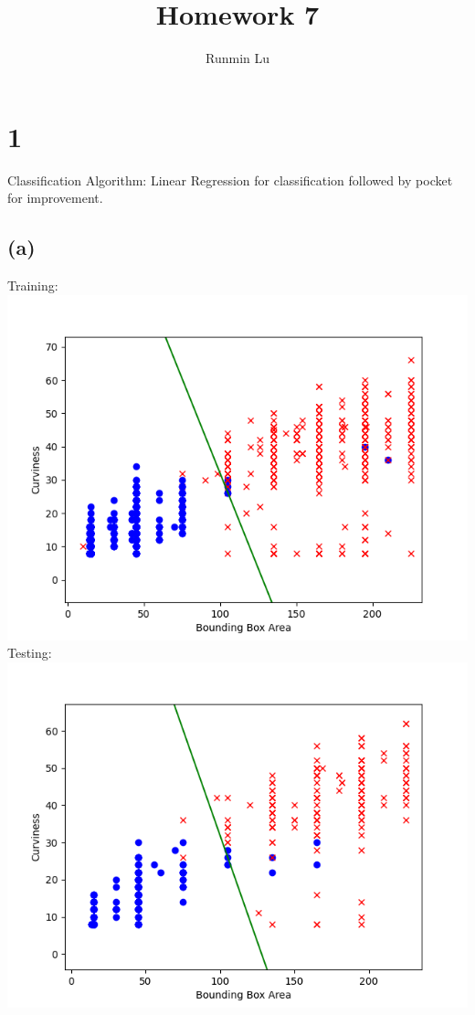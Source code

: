 \documentclass{article}
\title{Homework 7}
\author{Runmin Lu}
\begin{document}
	\maketitle
	
	\section*{1}
		Classification Algorithm: Linear Regression for classification followed by pocket for improvement.
		\subsection*{(a)}
			Training:\\
			\includegraphics[scale=0.5]{train.png}\\
			Testing:\\
			\includegraphics[scale=0.5]{test.png}
	
\end{document}

